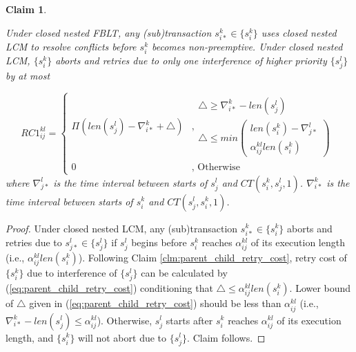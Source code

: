 \documentclass[10pt, conference, compsocconf]{IEEEtran}
\newtheorem{clm}{Claim}
\begin{document}
\begin{clm}\label{clm:closed_nested_lcm_before_alpha_two_tx}

Under closed nested FBLT, any (sub)transaction $s_{i*}^{k}\in\{s_{i}^{k}\}$
uses closed nested LCM to resolve conflicts before $s_{i}^{k}$ becomes
non-preemptive. Under closed nested LCM, $\{s_{i}^{k}\}$ aborts and
retries due to only one interference of higher priority $\{s_{j}^{l}\}$
by at most 

\begin{equation}
RC1_{ij}^{kl}=\begin{cases}
\Pi\left(len\left(s_{j}^{l}\right)-\nabla_{i*}^{k}+\triangle\right) & \mbox{,}\begin{gathered}\triangle\ge\nabla_{i*}^{k}-len\left(s_{j}^{l}\right)\\
\triangle\le min\left(\begin{gathered}len\left(s_{i}^{k}\right)-\nabla_{j*}^{l}\\
\alpha_{ij}^{kl}len\left(s_{i}^{k}\right)
\end{gathered}
\right)
\end{gathered}
\\
0 & \mbox{, Otherwise}
\end{cases}\label{eq:closed_nested_lcm_before_alpha_two_tx}
\end{equation}
where $\nabla_{j*}^{l}$ is the time interval between starts of $s_{j}^{l}$
and $CT(s_{i}^{k},s_{j}^{l},1)$. $\nabla_{i*}^{k}$ is the time interval
between starts of $s_{i}^{k}$ and $CT(s_{j}^{l},s_{i}^{k},1)$.

\end{clm}

\begin{proof}

Under closed nested LCM, any (sub)transaction $s_{i*}^{k}\in\{s_{i}^{k}\}$
aborts and retries due to $s_{j*}^{l}\in\{s_{j}^{l}\}$ if $s_{j}^{l}$
begins before $s_{i}^{k}$ reaches $\alpha_{ij}^{kl}$ of its execution
length (i.e., $\alpha_{ij}^{kl}len(s_{i}^{k})$). Following Claim
\ref{clm:parent_child_retry_cost}, retry cost of $\{s_{i}^{k}\}$
due to interference of $\{s_{j}^{l}\}$ can be calculated by (\ref{eq:parent_child_retry_cost})
conditioning that $\triangle\le\alpha_{ij}^{kl}len\left(s_{i}^{k}\right)$.
Lower bound of $\triangle$ given in (\ref{eq:parent_child_retry_cost})
should be less than $\alpha_{ij}^{kl}$ (i.e., $\nabla_{i*}^{k}-len\left(s_{j}^{l}\right)\le\alpha_{ij}^{kl}$).
Otherwise, $s_{j}^{l}$ starts after $s_{i}^{k}$ reaches $\alpha_{ij}^{kl}$
of its execution length, and $\{s_{i}^{k}\}$ will not abort due to
$\{s_{j}^{l}\}$. Claim follows.

\end{proof}
\end{document}

